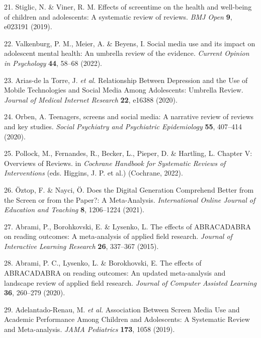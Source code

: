 \documentclass[
  english,
  man]{apa6}
\newenvironment{cslreferences}%
  {}%
  {\par}
\begin{document}
\begin{cslreferences}
\leavevmode\hypertarget{ref-stiglicEffectsScreentimeHealth2019}{}%
21. Stiglic, N. \& Viner, R. M. Effects of screentime on the health and well-being of children and adolescents: A systematic review of reviews. \emph{BMJ Open} \textbf{9}, e023191 (2019).

\leavevmode\hypertarget{ref-valkenburgSocialMediaUse2022}{}%
22. Valkenburg, P. M., Meier, A. \& Beyens, I. Social media use and its impact on adolescent mental health: An umbrella review of the evidence. \emph{Current Opinion in Psychology} \textbf{44}, 58--68 (2022).

\leavevmode\hypertarget{ref-arias-delatorreRelationshipDepressionUse2020}{}%
23. Arias-de la Torre, J. \emph{et al.} Relationship Between Depression and the Use of Mobile Technologies and Social Media Among Adolescents: Umbrella Review. \emph{Journal of Medical Internet Research} \textbf{22}, e16388 (2020).

\leavevmode\hypertarget{ref-orbenTeenagersScreensSocial2020}{}%
24. Orben, A. Teenagers, screens and social media: A narrative review of reviews and key studies. \emph{Social Psychiatry and Psychiatric Epidemiology} \textbf{55}, 407--414 (2020).

\leavevmode\hypertarget{ref-pollockChapterOverviewsReviews2022}{}%
25. Pollock, M., Fernandes, R., Becker, L., Pieper, D. \& Hartling, L. Chapter V: Overviews of Reviews. in \emph{Cochrane Handbook for Systematic Reviews of Interventions} (eds. Higgins, J. P. et al.) (Cochrane, 2022).

\leavevmode\hypertarget{ref-oztopDoesDigitalGeneration2021}{}%
26. Öztop, F. \& Nayci, Ö. Does the Digital Generation Comprehend Better from the Screen or from the Paper?: A Meta-Analysis. \emph{International Online Journal of Education and Teaching} \textbf{8}, 1206--1224 (2021).

\leavevmode\hypertarget{ref-abramiEffectsABRACADABRAReading2015}{}%
27. Abrami, P., Borohkovski, E. \& Lysenko, L. The effects of ABRACADABRA on reading outcomes: A meta-analysis of applied field research. \emph{Journal of Interactive Learning Research} \textbf{26}, 337--367 (2015).

\leavevmode\hypertarget{ref-abramiEffectsABRACADABRAReading2020}{}%
28. Abrami, P. C., Lysenko, L. \& Borokhovski, E. The effects of ABRACADABRA on reading outcomes: An updated meta-analysis and landscape review of applied field research. \emph{Journal of Computer Assisted Learning} \textbf{36}, 260--279 (2020).

\leavevmode\hypertarget{ref-adelantado-renauAssociationScreenMedia2019}{}%
29. Adelantado-Renau, M. \emph{et al.} Association Between Screen Media Use and Academic Performance Among Children and Adolescents: A Systematic Review and Meta-analysis. \emph{JAMA Pediatrics} \textbf{173}, 1058 (2019).


\end{cslreferences}
\end{document}
